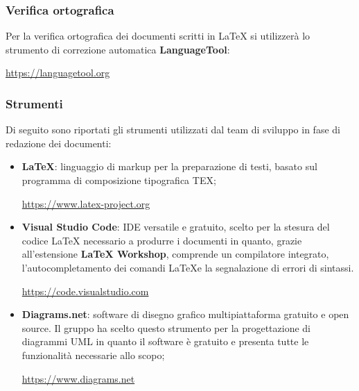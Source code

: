 \subsubsection{Verifica ortografica} \label{verifica_ortografica}
Per la verifica ortografica dei documenti scritti in \LaTeX{} si utilizzerà lo strumento di correzione automatica \textbf{LanguageTool}:
    \begin{center}\url{https://languagetool.org}\end{center}

\subsubsection{Strumenti}
Di seguito sono riportati gli strumenti utilizzati dal team di sviluppo in fase di redazione dei documenti:
\begin{itemize}
    \item \textbf{\LaTeX}: linguaggio di markup per la preparazione di testi, basato sul programma di composizione tipografica TEX;
         \begin{center}\url{https://www.latex-project.org}\end{center}
    \item \textbf{Visual Studio Code}: IDE\glo{} versatile e gratuito, scelto per la stesura del codice \LaTeX{} necessario a produrre i documenti in quanto, grazie all'estensione \textbf{LaTeX Workshop}, comprende un compilatore integrato, l'autocompletamento dei comandi \LaTeX e la segnalazione di errori di sintassi.
        \begin{center}\url{https://code.visualstudio.com}\end{center}
    \item \textbf{Diagrams.net}: software di disegno grafico multipiattaforma gratuito e open source. Il gruppo ha scelto questo strumento per la progettazione di diagrammi UML\glo{} in quanto il software è gratuito e presenta tutte le funzionalità necessarie allo scopo;
        \begin{center}\url{https://www.diagrams.net}\end{center}
\end{itemize}

